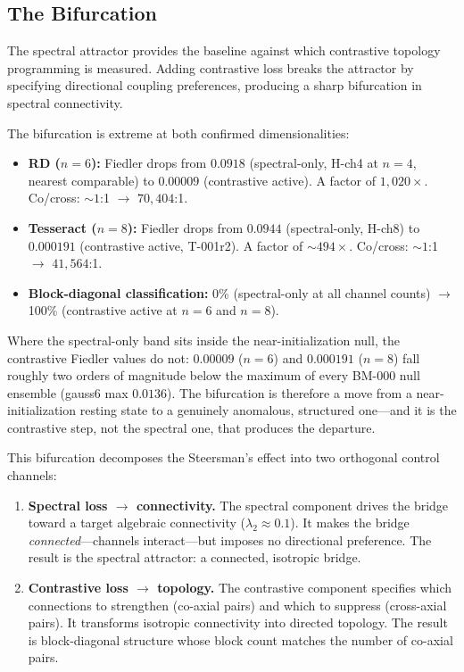 \subsection{The Bifurcation}
\label{sec:bifurcation}

The spectral attractor provides the baseline against which
contrastive topology programming is measured. Adding contrastive
loss breaks the attractor by specifying directional coupling
preferences, producing a sharp bifurcation in spectral connectivity.

The bifurcation is extreme at both confirmed dimensionalities:

\begin{itemize}
  \item \textbf{RD ($n = 6$):} Fiedler drops from $0.0918$
    (spectral-only, H-ch4 at $n = 4$, nearest comparable) to
    $0.00009$ (contrastive active). A factor of $1{,}020\times$.
    Co/cross: ${\sim}1$:1 $\to$ $70{,}404$:1.
  \item \textbf{Tesseract ($n = 8$):} Fiedler drops from $0.0944$
    (spectral-only, H-ch8) to $0.000191$ (contrastive active,
    T-001r2). A factor of ${\sim}494\times$. Co/cross: ${\sim}1$:1
    $\to$ $41{,}564$:1.
  \item \textbf{Block-diagonal classification:} 0\% (spectral-only
    at all channel counts) $\to$ 100\% (contrastive active at
    $n = 6$ and $n = 8$).
\end{itemize}

Where the spectral-only band sits inside the near-initialization null,
the contrastive Fiedler values do not: $0.00009$ ($n = 6$) and
$0.000191$ ($n = 8$) fall roughly two orders of magnitude below the
maximum of every BM-000 null ensemble (gauss6 max $0.0136$). The
bifurcation is therefore a move from a near-initialization resting state
to a genuinely anomalous, structured one---and it is the contrastive
step, not the spectral one, that produces the departure.

This bifurcation decomposes the Steersman's effect into two
orthogonal control channels:

\begin{enumerate}
  \item \textbf{Spectral loss $\to$ connectivity.} The spectral
    component drives the bridge toward a target algebraic
    connectivity ($\lambda_2 \approx 0.1$). It makes the bridge
    \emph{connected}---channels interact---but imposes no directional
    preference. The result is the spectral attractor: a connected,
    isotropic bridge.
  \item \textbf{Contrastive loss $\to$ topology.} The contrastive
    component specifies which connections to strengthen (co-axial
    pairs) and which to suppress (cross-axial pairs). It transforms
    isotropic connectivity into directed topology. The result is
    block-diagonal structure whose block count matches the number
    of co-axial pairs.
\end{enumerate}

